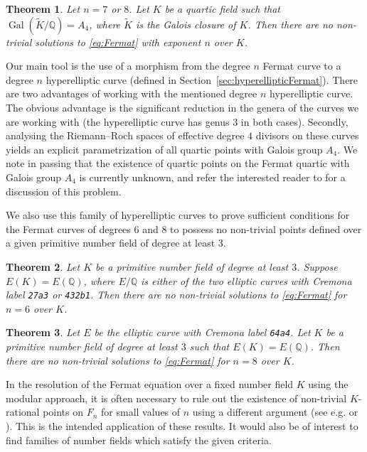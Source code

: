 \documentclass{amsart}
\newtheorem{thm}{Theorem}
\theoremstyle{definition}
\newcommand{\Q}{\mathbb{Q}}
\DeclareMathOperator{\Gal}{Gal}
\begin{document}
\begin{thm}\label{thm:F8quartic}
    Let $n=7$ or $8$.
    Let $K$ be a quartic field such that $\Gal(\tilde{K}/\Q)=A_4$, where $\tilde{K}$ is the Galois closure of $K$. Then there are no non-trivial solutions to \eqref{eq:Fermat} with exponent $n$ over $K$.
\end{thm}

Our main tool is the use of a morphism from the degree $n$ Fermat curve to a degree $n$ hyperelliptic curve (defined in Section~\ref{sec:hyperellipticFermat}). There are two advantages of working with the mentioned degree $n$ hyperelliptic curve. The obvious advantage is the significant reduction in the genera of the curves we are working with (the hyperelliptic curve has genus $3$ in both cases). Secondly, analysing the Riemann--Roch spaces of effective degree $4$ divisors on these curves yields an explicit parametrization of all quartic points with Galois group $A_4$. We note in passing that the existence of quartic points on the Fermat quartic with Galois group $A_4$ is currently unknown, and refer the interested reader to \cite[Section 4]{BremnerChoudhry} for a discussion of this problem.

We also use this family of hyperelliptic curves to prove sufficient conditions 
for the Fermat curves of degrees $6$ and $8$ to possess no non-trivial points 
defined over a given primitive number field of degree at least $3$.

\begin{thm}
    \label{thm:F6}
    Let $K$ be a primitive number field of degree at least $3$. 
    Suppose $E(K)=E(\Q)$, where $E/\Q$ is either of the two elliptic curves with Cremona label \texttt{27a3} or \texttt{432b1}.
    Then there are no non-trivial solutions to \eqref{eq:Fermat} for $n=6$ over $K$.
\end{thm}

\begin{thm}
    \label{thm:F8}
    Let $E$ be the elliptic curve with Cremona label \texttt{64a4}. 
    Let $K$ be a primitive number field of degree at least $3$ such that $E(K)=E(\Q)$. 
    Then there are no non-trivial solutions to \eqref{eq:Fermat} for $n=8$ over $K$.
\end{thm}

In the resolution of the Fermat equation over a fixed number field $K$ using the modular approach, it is often necessary to rule out the existence of non-trivial $K$-rational points on $F_n$ for small values of $n$ using a different argument (see e.g. \cite{JarvisMeekin} or \cite{KhawajaJarvis}). This is the intended application of these results. It would also be of interest to find families of number fields which satisfy the given criteria.\\
\end{document}
